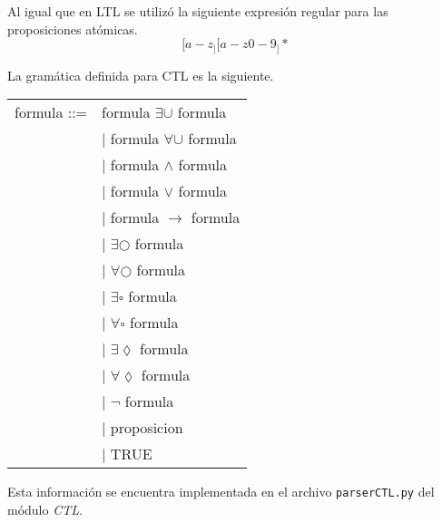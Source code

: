 Al igual que en LTL se utilizó la siguiente expresión regular para las proposiciones
 atómicas.
\[ [a-z_][a-z0-9_]* \]

La gramática definida para CTL es la siguiente.

\begin{center}
   \begin{tabular}{ | r l | }
     \hline
     formula ::= & formula $\exists\cup$ formula \\
     & $|$ formula $\forall\cup$ formula \\
	 & $|$ formula $\land$ formula \\
	 & $|$ formula $\lor$ formula \\
	 & $|$ formula $\rightarrow$ formula \\
	 & $|$ $\exists\bigcirc$ formula \\
	 & $|$ $\forall\bigcirc$ formula \\
	 & $|$ $\exists\square$ formula \\
	 & $|$ $\forall\square$ formula \\
	 & $|$ $\exists\lozenge$ formula \\
	 & $|$ $\forall\lozenge$ formula \\
	 & $|$ $\lnot$ formula \\
	 & $|$ proposicion \\
	 & $|$ TRUE \\
     \hline
   \end{tabular}
\end{center}

Esta información se encuentra implementada en el archivo \texttt{parserCTL.py} del
 módulo \textit{CTL}.

